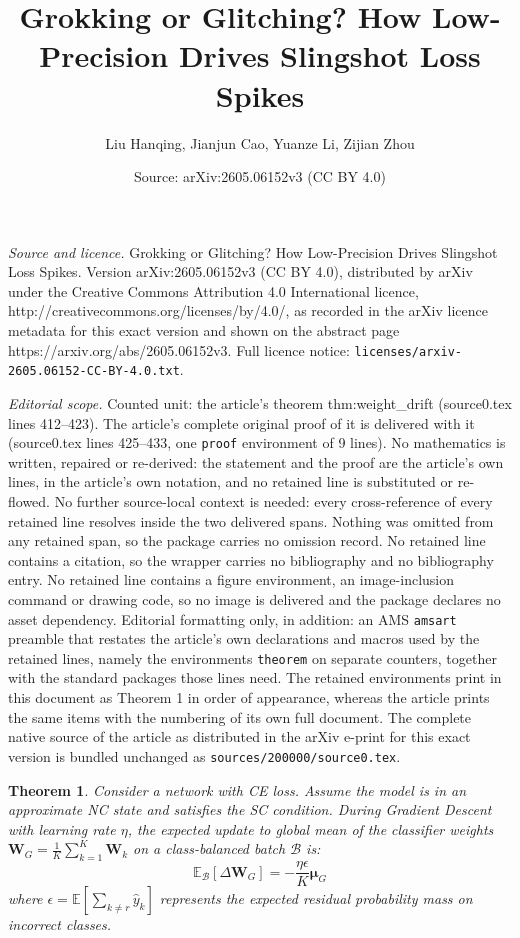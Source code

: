 \documentclass[10pt,a4paper]{amsart}
\title{Grokking or Glitching? How Low-Precision Drives Slingshot Loss Spikes}
\author{Liu Hanqing, Jianjun Cao, Yuanze Li, Zijian Zhou}
\date{Source: arXiv:2605.06152v3 (CC BY 4.0)}
\newtheorem{theorem}{Theorem}
\begin{document}
\maketitle

\noindent\emph{Source and licence.} Grokking or Glitching? How Low-Precision Drives Slingshot Loss Spikes. Version arXiv:2605.06152v3 (CC BY 4.0), distributed by arXiv under the Creative Commons Attribution 4.0 International licence, http://creativecommons.org/licenses/by/4.0/, as recorded in the arXiv licence metadata for this exact version and shown on the abstract page https://arxiv.org/abs/2605.06152v3. Full licence notice: \texttt{licenses/arxiv-2605.06152-CC-BY-4.0.txt}.\par\smallskip

\noindent\textit{Editorial scope.} Counted unit: the article's theorem thm:weight\_drift (source0.tex lines 412--423). The article's complete original proof of it is delivered with it (source0.tex lines 425--433, one \texttt{proof} environment of 9 lines). No mathematics is written, repaired or re-derived: the statement and the proof are the article's own lines, in the article's own notation, and no retained line is substituted or re-flowed.  No further source-local context is needed: every cross-reference of every retained line resolves inside the two delivered spans.  Nothing was omitted from any retained span, so the package carries no omission record.  No retained line contains a citation, so the wrapper carries no bibliography and no bibliography entry.  No retained line contains a figure environment, an image-inclusion command or drawing code, so no image is delivered and the package declares no asset dependency.  Editorial formatting only, in addition: an AMS \texttt{amsart} preamble that restates the article's own declarations and macros used by the retained lines, namely the environments \texttt{theorem} on separate counters, together with the standard packages those lines need.  The retained environments print in this document as Theorem 1 in order of appearance, whereas the article prints the same items with the numbering of its own full document.  The complete native source of the article as distributed in the arXiv e-print for this exact version is bundled unchanged as \texttt{sources/200000/source0.tex}.
\begin{theorem}
\label{thm:weight_drift}
Consider a network with CE loss. 
Assume the model is in an approximate NC state and satisfies the SC condition. 
During Gradient Descent with learning rate $\eta$, 
the expected update to global mean of the classifier weights $\bm{W}_G= \frac{1}{K} \sum_{k=1}^K \bm{W}_k$ 
on a class-balanced batch $\mathcal{B}$ is:
\begin{equation}
    \mathbb{E}_{\mathcal{B}}[\Delta \bm{W}_G] = - \frac{\eta \epsilon }{K} \bm{\mu}_G
\end{equation}
where $\epsilon = \mathbb{E}[\sum_{k \neq r} \hat{y}_k]$ represents the expected residual probability mass on incorrect classes.
\end{theorem}
\end{document}
